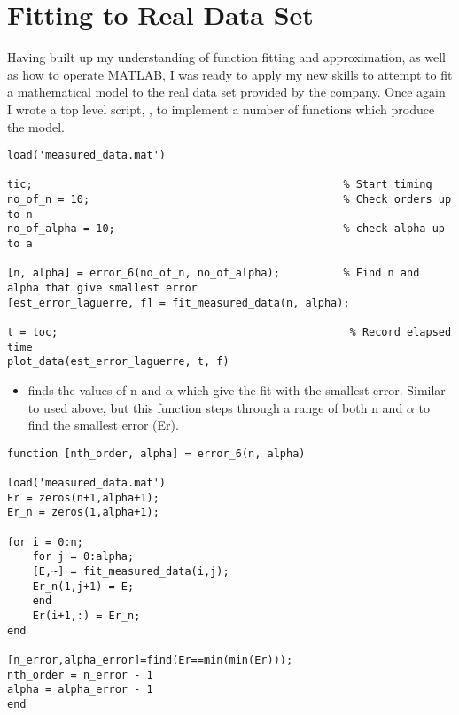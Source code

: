 \documentclass{article}
\begin{document}
\section{Fitting to Real Data Set}


Having built up my understanding of function fitting and approximation, as well as how to operate MATLAB, I was ready to apply my new skills to attempt to fit a mathematical model to the real data set provided by the company. Once again I wrote a top level script, , to implement a number of functions which produce the model. 


\begin{lstlisting}
load('measured_data.mat')

tic;                                                 % Start timing
no_of_n = 10;                                        % Check orders up to n
no_of_alpha = 10;                                    % check alpha up to a
   
[n, alpha] = error_6(no_of_n, no_of_alpha);          % Find n and alpha that give smallest error
[est_error_laguerre, f] = fit_measured_data(n, alpha);      

t = toc;									          % Record elapsed time
plot_data(est_error_laguerre, t, f)
\end{lstlisting}

\begin{itemize}

\item {} finds the values of n and $\alpha$ which give the fit with the smallest error. Similar to  used above, but this function steps through a range of both n and $\alpha$ to find the smallest error (Er).

\end{itemize}


\begin{lstlisting}
function [nth_order, alpha] = error_6(n, alpha)

load('measured_data.mat')
Er = zeros(n+1,alpha+1);
Er_n = zeros(1,alpha+1);

for i = 0:n;
    for j = 0:alpha;
    [E,~] = fit_measured_data(i,j);
    Er_n(1,j+1) = E;
    end
    Er(i+1,:) = Er_n;
end

[n_error,alpha_error]=find(Er==min(min(Er))); 
nth_order = n_error - 1
alpha = alpha_error - 1
end
\end{lstlisting}
 
\end{document}

